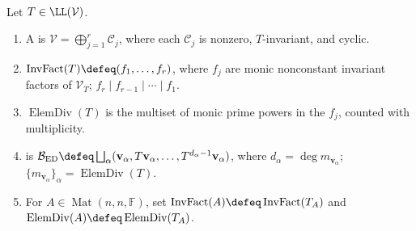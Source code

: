 \begin{definition} \label{def:operator-invariant-factors-elementary-divisors} \\
Let $T\in\LL(\mathcal{V})$.
\begin{enumerate}[label=(\roman*)]
\setlength{\itemsep}{0pt}
\item A  is $\mathcal{V}=\bigoplus_{j=1}^r\mathcal{C}_j$, where each $\mathcal{C}_j$ is nonzero, $T$-invariant, and cyclic.
\item $\operatorname{InvFact}(T)\defeq(f_1,\ldots,f_r)$, where $f_j$ are monic nonconstant invariant factors of $\mathcal{V}_T$; $f_r\mid f_{r-1}\mid\cdots\mid f_1$.
\item $\operatorname{ElemDiv}(T)$ is the multiset of monic prime powers in the $f_j$, counted with multiplicity.
\item {} is $\mathcal{B}_{\operatorname{ED}}\defeq\bigsqcup_{\alpha}(\mathbf{v}_{\alpha},T\mathbf{v}_{\alpha},\ldots,T^{d_{\alpha}-1}\mathbf{v}_{\alpha})$, where $d_{\alpha}=\deg m_{\mathbf{v}_{\alpha}}$; $\{m_{\mathbf{v}_{\alpha}}\}_{\alpha}=\operatorname{ElemDiv}(T)$.
\item For $A\in\operatorname{Mat}(n,n,\mathbb{F})$, set $\operatorname{InvFact}(A)\defeq\operatorname{InvFact}(T_A)$ and $\operatorname{ElemDiv}(A)\defeq\operatorname{ElemDiv}(T_A)$.
\end{enumerate}
\end{definition}

